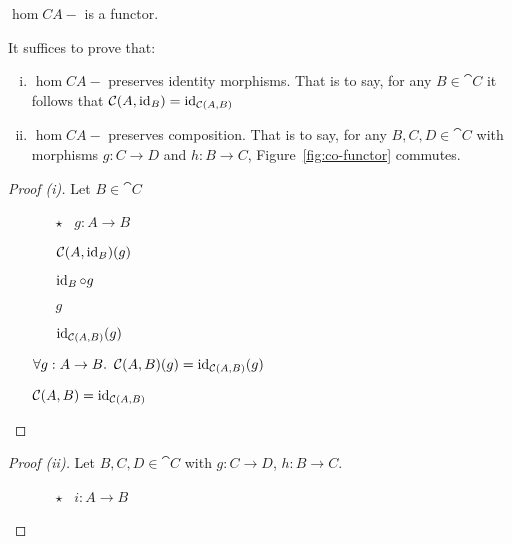 \begin{prop}
  $\hom{C}{A}{-}$ is a functor.

  It suffices to prove that:
  \begin{enumerate}[(i)]
    \item $\hom{C}{A}{-}$ preserves identity morphisms. That is to say, for any $B\in\cat{C}$ it follows that $\mathcal{C}(A, \operatorname{id}_B) = \operatorname{id}_{\mathcal{C}(A, B)}$
    \item $\hom{C}{A}{-}$ preserves composition. That is to say, for any $B,C,D\in\cat{C}$ with morphisms $g : C \to D$
      and $h : B \to C$, Figure~\ref{fig:co-functor} commutes.
  \end{enumerate}
  \begin{proof}[Proof (i)]
    Let $B\in\cat{C}$
    \begin{itemize}
    \item[\phs]
        \begin{itemize}
          \item[$\star$] \Let~$g : A \to B$
              \marginnote{\Hyp}
            \item[\phs]
              $\mathcal{C}(A, \operatorname{id}_B)(g)$

            \item[\eqs]
              $\operatorname{id}_B\circ g$
              \marginnote{\Def-\ref{def:co-hom}}

            \item[\eqs]
              $g$
              \marginnote{\Def-$\id$}

            \item[\eqs]
              $\operatorname{id}_{\mathcal{C}(A, B)}(g)$
              \marginnote{\Def-$\id$}
        \end{itemize}

      \item[\imps]
        $\forall g : A \to B\ldotp~\mathcal{C}(A, B)(g) = \operatorname{id}_{\mathcal{C}(A, B)}(g)$
        \marginnote{$\forall$-\Intro-$\star$}

      \item[\iffs]
        $\mathcal{C}(A, B) = \operatorname{id}_{\mathcal{C}(A, B)}$
        \marginnote{\Def-=}
        \qedhere
    \end{itemize}
  \end{proof}

  \begin{proof}[Proof (ii)]
    Let $B, C, D\in\cat{C}$ with ${g : C\to D}$, ${h : B\to C}$.
    \begin{itemize}
      \item[\phs]
        \begin{itemize}
          \item[$\star$] \Let~$i : A\to B$
            \marginnote{\Hyp}


\end{itemize}
\end{itemize}
\end{proof}
\end{prop}
